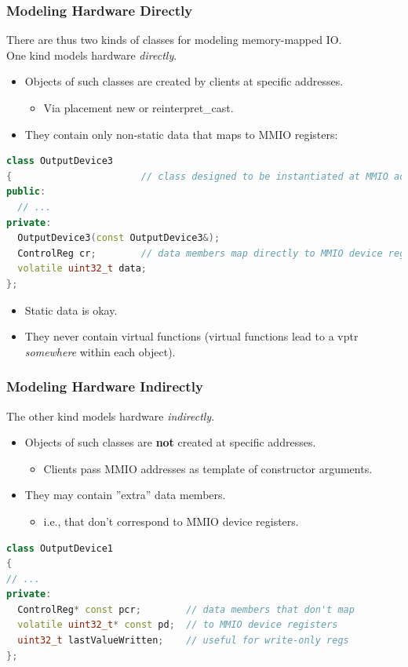 \subsubsection{Modeling Hardware Directly}
There are thus two kinds of classes for modeling memory-mapped IO.\\
One kind models hardware \textit{directly}.
\begin{itemize}
  \item Objects of such classes are created by clients at specific addresses.
  \begin{itemize}
    \item Via placement new or reinterpret\_cast.
  \end{itemize}
  \item They contain only non-static data that maps to MMIO registers:
\end{itemize}
\begin{lstlisting}[language=C++]
class OutputDevice3
{                       // class designed to be instantiated at MMIO addresses
public:
  // ...
private:
  OutputDevice3(const OutputDevice3&);
  ControlReg cr;        // data members map directly to MMIO device registers
  volatile uint32_t data;
};
\end{lstlisting}
\begin{itemize}
  \item Static data is okay.
  \item They never contain virtual functions (virtual functions lead to a vptr \textit{somewhere} within each object).
\end{itemize}

\subsubsection{Modeling Hardware Indirectly}
The other kind models hardware \textit{indirectly}.
\begin{itemize}
  \item Objects of such classes are \textbf{not} created at specific addresses.
  \begin{itemize}
    \item Clients pass MMIO addresses as template of constructor arguments.
  \end{itemize}
  \item They may contain ''extra'' data members.
  \begin{itemize}
    \item i.e., that don't correspond to MMIO device registers.
  \end{itemize}
\end{itemize}
\begin{lstlisting}[language=C++]
class OutputDevice1
{
// ...
private:
  ControlReg* const pcr;        // data members that don't map
  volatile uint32_t* const pd;  // to MMIO device registers
  uint32_t lastValueWritten;    // useful for write-only regs
};
\end{lstlisting}

